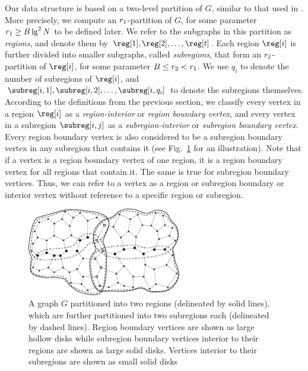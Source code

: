 Our data structure is based on a two-level partition of $G$, similar to
that used in \cite{DBLP:journals/talg/BoseCHMM12}.
More precisely, we compute an
$r_1$-partition of $G$, for some parameter $r_1 \ge B \lg^2 N$ to be
defined later.
We refer to the subgraphs in this partition as \emph{regions}, and
denote them by $\reg[1], \reg[2], \dots, \reg[t]$.
Each region $\reg[i]$ is further
divided into smaller subgraphs, called \emph{subregions}, that form
an $r_2$-partition of $\reg[i]$, for some parameter
$B \le r_2 < r_1$.
We use $q_i$ to denote the number of subregions of $\reg[i]$, and $\subreg[i,1],
\subreg[i,2], \dots, \subreg[i,q_i]$ to denote the subregions themselves.
According to the definitions from the previous section, we classify
every vertex in a region $\reg[i]$ as a \emph{region-interior} or
\emph{region boundary vertex}, and every vertex in a subregion
$\subreg[i,j]$ as a \emph{subregion-interior} or \emph{subregion boundary
  vertex}.
Every region boundary vertex is also considered to be a
subregion boundary vertex in any subregion that contains it
(see Fig.~\ref{fig:partitioned_graph} for an illustration).
Note that if a vertex is a region boundary vertex of one region, it is a region
boundary vertex for all regions that contain it.
The same is true for subregion boundary vertices.
Thus, we can refer to a vertex as a region or subregion boundary or interior
vertex without reference to a specific region or subregion.

\begin{figure}[t]
  \centering
  \includegraphics[width=0.6\textwidth]{Fig1}
  \caption[Recursively-partitioned graph]{A graph $G$ partitioned into two 
	regions (delineated by solid lines), which are further partitioned into two 
	subregions each (delineated by dashed lines).
    Region boundary vertices are shown as large hollow disks while subregion 
	boundary vertices interior to their regions are shown as large solid disks.
    Vertices interior to their subregions are shown as small solid disks}
  \label{fig:partitioned_graph}
\end{figure}


